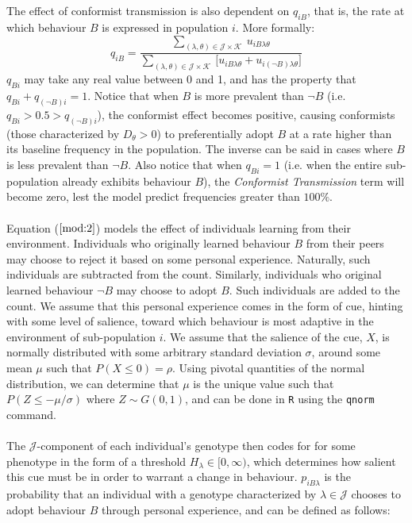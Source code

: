 \documentclass[a4paper,8pt]{extarticle}
\begin{document}
\\\\
The effect of conformist transmission is also dependent on $q_{iB}$, that is, the rate at which behaviour $B$ is expressed in population $i$. More formally:
\[
    q_{iB}=
    \frac{
        \displaystyle\sum_{(\lambda,\theta)\in\mathcal J\times \mathcal K} \ u_{iB\lambda\theta}
    }{
        \displaystyle\sum_{(\lambda,\theta)\in\mathcal J\times \mathcal K} \  \Big[u_{iB\lambda\theta}+u_{i(\lnot B)\lambda\theta}\Big]
    }
\]
$q_{Bi}$ may take any real value between 0 and 1, and has the property that \mbox{$q_{Bi}+q_{(\lnot B)i}=1$}. Notice that when $B$ is more prevalent than $\lnot B$ (i.e. \mbox{$q_{Bi}>0.5>q_{(\lnot B)i}$}), the conformist effect becomes positive, causing conformists (those characterized by $D_\theta>0$) to preferentially adopt $B$ at a rate higher than its baseline frequency in the population. The inverse can be said in cases where $B$ is less prevalent than $\lnot B$. Also notice that when $q_{Bi}=1$ (i.e. when the entire sub-population already exhibits behaviour $B$), the \emph{Conformist Transmission} term will become zero, lest the model predict frequencies greater than $100\%$.
\\\\
Equation ($\ref{mod:2}$) models the effect of individuals learning from their environment. Individuals who originally learned behaviour $B$ from their peers may choose to reject it based on some personal experience. Naturally, such individuals are subtracted from the count. Similarly, individuals who original learned behaviour $\lnot B$ may choose to adopt $B$. Such individuals are added to the count. We assume that this personal experience comes in the form of cue, hinting with some level of salience, toward which behaviour is most adaptive in the environment of sub-population $i$. We assume that the salience of the cue, $X$, is normally distributed with some arbitrary standard deviation $\sigma$, around some mean $\mu$ such that $P(X\le 0)=\rho$. Using pivotal quantities of the normal distribution, we can determine that $\mu$ is the unique value such that $P(Z\le -\mu/\sigma)$ where $Z\sim G(0,1)$, and can be done in \texttt R using the \texttt {qnorm} command.
\\\\
The $\mathcal J$-component of each individual's genotype then codes for for some phenotype in the form of a threshold $H_\lambda\in[0,\infty)$, which determines how salient this cue must be in order to warrant a change in behaviour. $p_{iB\lambda}$ is the probability that an individual with a genotype characterized by $\lambda\in\mathcal J$ chooses to adopt behaviour $B$ through personal experience, and can be defined as follows:
\end{document}
